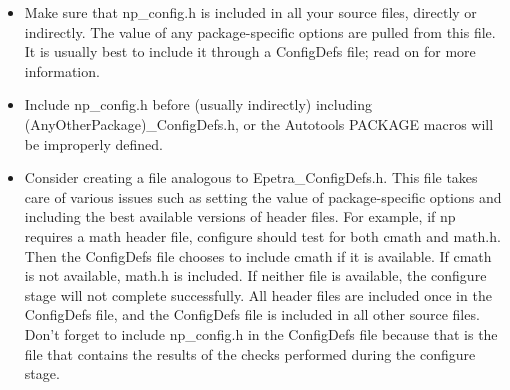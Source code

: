 \documentclass[12pt,relax]{TrilinosDevGuide}
\begin{document}
\begin{itemize}
\item Make sure that np\_config.h is included in all your source
files, directly or indirectly.  The value of any package-specific options are 
pulled from this file.  It is usually best to include it through a 
ConfigDefs file; read on for more information.  

\item Include np\_config.h before (usually indirectly) including \newline
(AnyOtherPackage)\_ConfigDefs.h, or the Autotools PACKAGE macros will 
be improperly defined.

\item Consider creating a file analogous to Epetra\_ConfigDefs.h.  This file 
takes care of various issues such as setting the value of package-specific 
options and including the best available versions of header files.  For 
example, if np requires a math header file, configure should test for both 
cmath and math.h.  Then the ConfigDefs file chooses to include cmath if it 
is available.  If cmath is not available, math.h is included.  If neither file 
is available, the configure stage will not complete successfully.  All header 
files are included once in the ConfigDefs file, and the ConfigDefs file is 
included in all other source files.  Don't forget to include np\_config.h in 
the ConfigDefs file because that is the file that contains the results of the 
checks performed during the configure stage.

\end{itemize}
\end{document}
